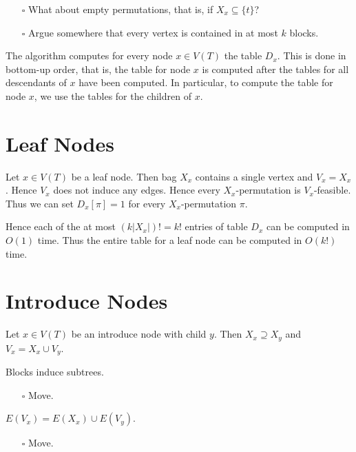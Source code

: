 \documentclass[fontsize=11pt,paper=a4]{book}
\begin{document}
\begin{itemize}
\item[{$\square$}] What about empty permutations, that is, if \(X_x\subseteq\{t\}\)?

\item[{$\square$}] Argue somewhere that every vertex is contained in at most \(k\) blocks.
\end{itemize}


The algorithm computes for every node \(x\in V(T)\) the table \(D_x\).
This is done in bottom-up order, that is, the table for node \(x\) is computed after the tables for all descendants of \(x\) have been computed.
In particular, to compute the table for node \(x\), we use the tables for the children of \(x\).

\section{Leaf Nodes}
\label{sec:orge62eb32}

Let \(x\in V(T)\) be a leaf node.
Then bag \(X_x\) contains a single vertex and \(V_x=X_x\).
Hence \(V_x\) does not induce any edges.
Hence every \(X_x\)-permutation is \(V_x\)-feasible.
Thus we can set \(D_x[\pi]=1\) for every \(X_x\)-permutation \(\pi\).

Hence each of the at most \((k\lvert X_x\rvert)!=k!\) entries of table \(D_x\) can be computed in \(O(1)\) time.
Thus the entire table for a leaf node can be computed in \(O(k!)\) time.

\section{Introduce Nodes}
\label{sec:org70e49f4}

Let \(x\in V(T)\) be an introduce node with child \(y\).
Then \(X_x\supseteq X_y\) and \(V_x=X_x\cup V_y\).

\begin{lem}
Blocks induce subtrees.
\label{org49525b5}
\end{lem}

\begin{itemize}
\item[{$\square$}] Move.
\end{itemize}

\begin{lem}
\(E(V_x)=E(X_x)\cup E(V_y)\).
\label{orgd0a2d03}
\end{lem}

\begin{itemize}
\item[{$\square$}] Move.
\end{itemize}
\end{document}
